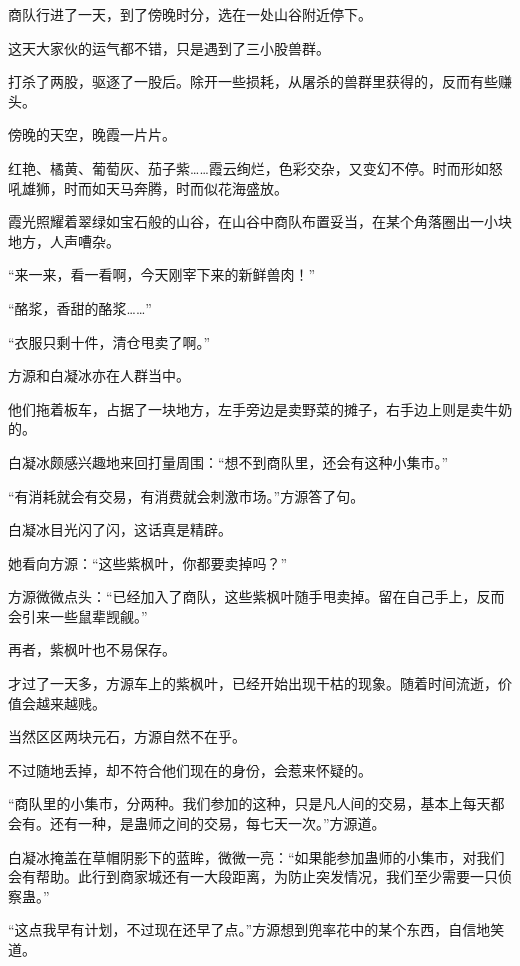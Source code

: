 
\begin{this_body}



商队行进了一天，到了傍晚时分，选在一处山谷附近停下。

这天大家伙的运气都不错，只是遇到了三小股兽群。

打杀了两股，驱逐了一股后。除开一些损耗，从屠杀的兽群里获得的，反而有些赚头。

傍晚的天空，晚霞一片片。

红艳、橘黄、葡萄灰、茄子紫……霞云绚烂，色彩交杂，又变幻不停。时而形如怒吼雄狮，时而如天马奔腾，时而似花海盛放。

霞光照耀着翠绿如宝石般的山谷，在山谷中商队布置妥当，在某个角落圈出一小块地方，人声嘈杂。

“来一来，看一看啊，今天刚宰下来的新鲜兽肉！”

“酪浆，香甜的酪浆……”

“衣服只剩十件，清仓甩卖了啊。”

方源和白凝冰亦在人群当中。

他们拖着板车，占据了一块地方，左手旁边是卖野菜的摊子，右手边上则是卖牛奶的。

白凝冰颇感兴趣地来回打量周围：“想不到商队里，还会有这种小集市。”

“有消耗就会有交易，有消费就会刺激市场。”方源答了句。

白凝冰目光闪了闪，这话真是精辟。

她看向方源：“这些紫枫叶，你都要卖掉吗？”

方源微微点头：“已经加入了商队，这些紫枫叶随手甩卖掉。留在自己手上，反而会引来一些鼠辈觊觎。”

再者，紫枫叶也不易保存。

才过了一天多，方源车上的紫枫叶，已经开始出现干枯的现象。随着时间流逝，价值会越来越贱。

当然区区两块元石，方源自然不在乎。

不过随地丢掉，却不符合他们现在的身份，会惹来怀疑的。

“商队里的小集市，分两种。我们参加的这种，只是凡人间的交易，基本上每天都会有。还有一种，是蛊师之间的交易，每七天一次。”方源道。

白凝冰掩盖在草帽阴影下的蓝眸，微微一亮：“如果能参加蛊师的小集市，对我们会有帮助。此行到商家城还有一大段距离，为防止突发情况，我们至少需要一只侦察蛊。”

“这点我早有计划，不过现在还早了点。”方源想到兜率花中的某个东西，自信地笑道。


\end{this_body}
